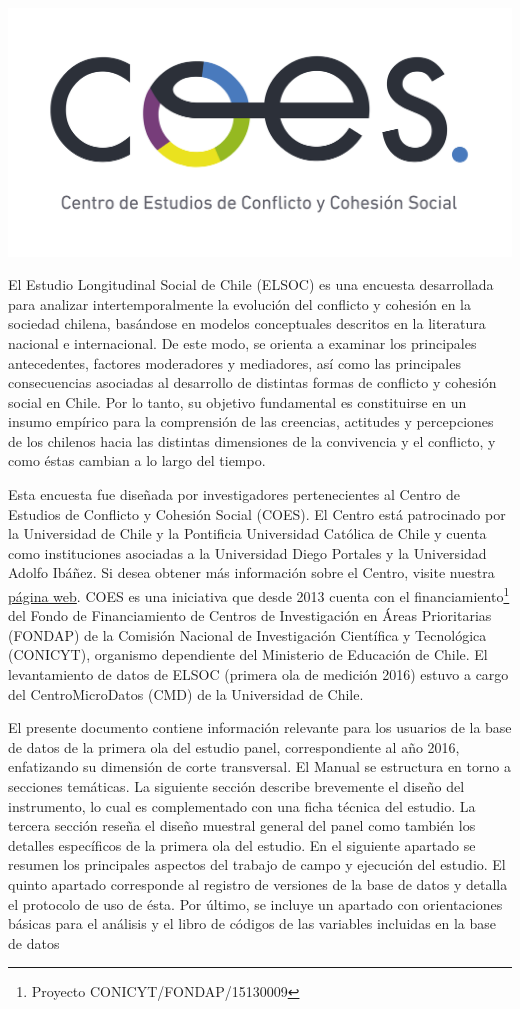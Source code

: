 \documentclass[
]{book}
\begin{document}
\begin{center}\includegraphics[width=0.6\linewidth,height=0.6\textheight]{imagenes/coes_blanco_esp} \end{center}

El Estudio Longitudinal Social de Chile (ELSOC) es una encuesta desarrollada para analizar intertemporalmente la evolución del conflicto y cohesión en la sociedad chilena, basándose en modelos conceptuales descritos en la literatura nacional e internacional. De este modo, se orienta a examinar los principales antecedentes, factores moderadores y mediadores, así como las principales consecuencias asociadas al desarrollo de distintas formas de conflicto y cohesión social en Chile. Por lo tanto, su objetivo fundamental es constituirse en un insumo empírico para la comprensión de las creencias, actitudes y percepciones de los chilenos hacia las distintas dimensiones de la convivencia y el conflicto, y como éstas cambian a lo largo del tiempo.

Esta encuesta fue diseñada por investigadores pertenecientes al Centro de Estudios de Conflicto y Cohesión Social (COES). El Centro está patrocinado por la Universidad de Chile y la Pontificia Universidad Católica de Chile y cuenta como instituciones asociadas a la Universidad Diego Portales y la Universidad Adolfo Ibáñez. Si desea obtener más información sobre el Centro, visite nuestra \href{http://www.coes.cl/}{página web}. COES es una iniciativa que desde 2013 cuenta con el financiamiento\footnote{Proyecto CONICYT/FONDAP/15130009} del Fondo de Financiamiento de Centros de Investigación en Áreas Prioritarias (FONDAP) de la Comisión Nacional de Investigación Científica y Tecnológica (CONICYT), organismo dependiente del Ministerio de Educación de Chile. El levantamiento de datos de ELSOC (primera ola de medición 2016) estuvo a cargo del CentroMicroDatos (CMD) de la Universidad de Chile.

El presente documento contiene información relevante para los usuarios de la base de datos de la primera ola del estudio panel, correspondiente al año 2016, enfatizando su dimensión de corte transversal. El Manual se estructura en torno a secciones temáticas. La siguiente sección describe brevemente el diseño del instrumento, lo cual es complementado con una ficha técnica del estudio. La tercera sección reseña el diseño muestral general del panel como también los detalles específicos de la primera ola del estudio. En el siguiente apartado se resumen los principales aspectos del trabajo de campo y ejecución del estudio. El quinto apartado corresponde al registro de versiones de la base de datos y detalla el protocolo de uso de ésta. Por último, se incluye un apartado con orientaciones básicas para el análisis y el libro de códigos de las variables incluidas en la base de datos
\end{document}
